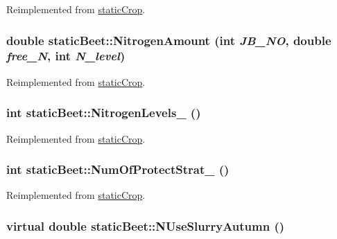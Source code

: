 Reimplemented from \hyperlink{classstatic_crop_a9b67ef1ae531a3afb32b63a4aeb5916b}{staticCrop}.\hypertarget{classstatic_beet_a98d8ce60295b7390603ce557a7f47fb3}{
\subsubsection[{NitrogenAmount}]{\setlength{\rightskip}{0pt plus 5cm}double staticBeet::NitrogenAmount (int {\em JB\_\-NO}, \/  double {\em free\_\-N}, \/  int {\em N\_\-level})}}
\label{classstatic_beet_a98d8ce60295b7390603ce557a7f47fb3}


Reimplemented from \hyperlink{classstatic_crop_af3aa85321a8a75406f8a0751b71587d0}{staticCrop}.\hypertarget{classstatic_beet_a399a5b014205aaa03ddb6ea0eeecd122}{
\subsubsection[{NitrogenLevels\_\-}]{\setlength{\rightskip}{0pt plus 5cm}int staticBeet::NitrogenLevels\_\- ()}}
\label{classstatic_beet_a399a5b014205aaa03ddb6ea0eeecd122}


Reimplemented from \hyperlink{classstatic_crop_a32b69ed138beaed150efa74d18e82d8e}{staticCrop}.\hypertarget{classstatic_beet_afce21aaadaf9e47e51b613bedf0aeca1}{
\subsubsection[{NumOfProtectStrat\_\-}]{\setlength{\rightskip}{0pt plus 5cm}int staticBeet::NumOfProtectStrat\_\- ()}}
\label{classstatic_beet_afce21aaadaf9e47e51b613bedf0aeca1}


Reimplemented from \hyperlink{classstatic_crop_a4d3d767f569f48eb68ffa76822302467}{staticCrop}.\hypertarget{classstatic_beet_a3f8cb12e397cc68f0a2232f962c4ae08}{
\subsubsection[{NUseSlurryAutumn}]{\setlength{\rightskip}{0pt plus 5cm}virtual double staticBeet::NUseSlurryAutumn ()}}
\label{classstatic_beet_a3f8cb12e397cc68f0a2232f962c4ae08}


